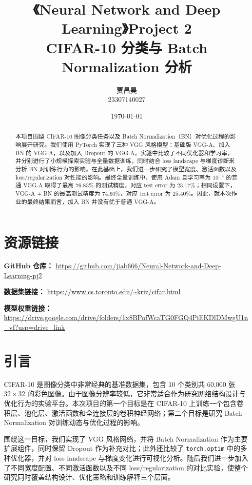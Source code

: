 \documentclass[11pt]{article}
\title{《Neural Network and Deep Learning》Project 2\\
\large CIFAR-10 分类与 Batch Normalization 分析}
\author{贾昌昊 \\ 23307140027}
\date{\today}
\begin{document}
\maketitle
\sloppy

\begin{abstract}
本项目围绕 CIFAR-10 图像分类任务以及 Batch Normalization（BN）对优化过程的影响展开研究。我们使用 PyTorch 实现了三种 VGG 风格模型：基础版 VGG-A、加入 BN 的 VGG-A，以及加入 Dropout 的 VGG-A。实验中比较了不同优化器和学习率，并分别进行了小规模探索实验与全量数据训练，同时结合 loss landscape 与梯度诊断来分析 BN 对训练行为的影响。在此基础上，我们进一步研究了模型宽度、激活函数以及 loss/regularization 对性能的影响。最终全量训练中，使用 Adam 且学习率为 $10^{-4}$ 的普通 VGG-A 取得了最高 $76.83\%$ 的测试精度，对应 test error 为 $23.17\%$；相同设置下，VGG-A + BN 的最高测试精度为 $74.60\%$，对应 test error 为 $25.40\%$。因此，就本次作业的最终结果而言，加入 BN 并没有优于普通 VGG-A。
\end{abstract}

\section{资源链接}

\textbf{GitHub 仓库：} \url{https://github.com/jiab666/Neural-Network-and-Deep-Learning-pj2}

\textbf{数据集链接：} \url{https://www.cs.toronto.edu/~kriz/cifar.html}

\textbf{模型权重链接：} \url{https://drive.google.com/drive/folders/1x8BPofWcaTG0FGQ4PiEKDlDMwgU1n_vf?usp=drive_link}

\section{引言}
CIFAR-10 是图像分类中非常经典的基准数据集，包含 10 个类别共 60,000 张 $32 \times 32$ 的彩色图像。由于图像分辨率较低，它非常适合作为研究网络结构设计与优化行为的实验平台。本次项目的第一个目标是在 CIFAR-10 上训练一个包含卷积层、池化层、激活函数和全连接层的卷积神经网络；第二个目标是研究 Batch Normalization 对训练动态与优化过程的影响。

围绕这一目标，我们实现了 VGG 风格网络，并将 Batch Normalization 作为主要扩展组件，同时保留 Dropout 作为补充对比；此外还比较了 \texttt{torch.optim} 中的多种优化器，并对 loss landscape 与梯度变化进行可视化分析。随后我们进一步加入了不同宽度配置、不同激活函数以及不同 loss/regularization 的对比实验，使整个研究同时覆盖结构设计、优化策略和训练解释三个层面。
\end{document}
